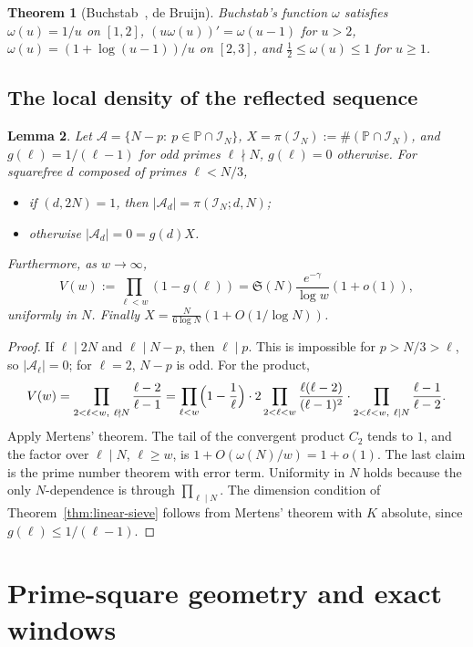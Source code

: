\documentclass[final,11pt]{elsarticle}
\newtheorem{theorem}{Theorem}[section]
\newtheorem{lemma}[theorem]{Lemma}
\theoremstyle{definition}
\theoremstyle{remark}
\newcommand{\PP}{\mathbb{P}}
\newcommand{\Sg}{\mathfrak{S}}
\newcommand{\band}{\mathcal{I}_N}
\numberwithin{equation}{section}
\begin{document}
\begin{theorem}[Buchstab~\cite{Buchstab}, de Bruijn]\label{thm:buchstab}
Buchstab's function $\omega$ satisfies $\omega(u)=1/u$ on $[1,2]$, $(u\omega(u))'=\omega(u-1)$ for $u>2$, $\omega(u)=(1+\log(u-1))/u$ on $[2,3]$, and $\tfrac12\le\omega(u)\le1$ for $u\ge1$.
\end{theorem}

\subsection{The local density of the reflected sequence}

\begin{lemma}\label{lem:density}
Let $\mathcal A=\{N-p:\ p\in\PP\cap\band\}$, $X=\pi(\band):=\#(\PP\cap\band)$, and $g(\ell)=1/(\ell-1)$ for odd primes $\ell\nmid N$, $g(\ell)=0$ otherwise. For squarefree $d$ composed of primes $\ell<N/3$,
\begin{itemize}
\item if $(d,2N)=1$, then $|\mathcal A_d|=\pi(\band;d,N)$;
\item otherwise $|\mathcal A_d|=0=g(d)X$.
\end{itemize}
Furthermore, as $w\to\infty$,
\[
V(w):=\prod_{\ell<w}(1-g(\ell))=\Sg(N)\frac{e^{-\gamma}}{\log w}(1+o(1)),
\]
uniformly in $N$. Finally $X=\frac{N}{6\log N}(1+O(1/\log N))$.
\end{lemma}

\begin{proof}
If $\ell\mid 2N$ and $\ell\mid N-p$, then $\ell\mid p$. This is impossible for $p>N/3>\ell$, so $|\mathcal A_\ell|=0$; for $\ell=2$, $N-p$ is odd. For the product,
\[
V(w)=\prod_{2<\ell<w,\ \ell\nmid N}\frac{\ell-2}{\ell-1}=\prod_{\ell<w}\Bigl(1-\frac1\ell\Bigr)\cdot 2\prod_{2<\ell<w}\frac{\ell(\ell-2)}{(\ell-1)^2}\cdot\prod_{2<\ell<w,\ \ell\mid N}\frac{\ell-1}{\ell-2}.
\]
Apply Mertens' theorem. The tail of the convergent product $C_2$ tends to $1$, and the factor over $\ell\mid N$, $\ell\ge w$, is $1+O(\omega(N)/w)=1+o(1)$. The last claim is the prime number theorem with error term. Uniformity in $N$ holds because the only $N$-dependence is through $\prod_{\ell\mid N}$. The dimension condition of Theorem~\ref{thm:linear-sieve} follows from Mertens' theorem with $K$ absolute, since $g(\ell)\le1/(\ell-1)$. \qedhere
\end{proof}


\section{Prime-square geometry and exact windows}\label{sec:block1}
\end{document}
